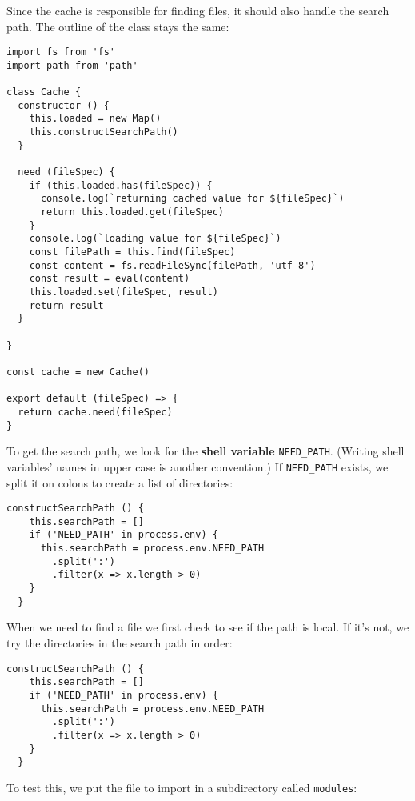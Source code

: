 \documentclass[krantzl]{krantz}
\newcommand{\glossref}[1]{\textbf{#1}}
\begin{document}
Since the cache is responsible for finding files,
it should also handle the search path.
The outline of the class stays the same:


\begin{lstlisting}[frame=tblr]
import fs from 'fs'
import path from 'path'

class Cache {
  constructor () {
    this.loaded = new Map()
    this.constructSearchPath()
  }

  need (fileSpec) {
    if (this.loaded.has(fileSpec)) {
      console.log(`returning cached value for ${fileSpec}`)
      return this.loaded.get(fileSpec)
    }
    console.log(`loading value for ${fileSpec}`)
    const filePath = this.find(fileSpec)
    const content = fs.readFileSync(filePath, 'utf-8')
    const result = eval(content)
    this.loaded.set(fileSpec, result)
    return result
  }

}

const cache = new Cache()

export default (fileSpec) => {
  return cache.need(fileSpec)
}
\end{lstlisting}



To get the search path,
we look for the \glossref{shell variable} \texttt{NEED\_PATH}.
(Writing shell variables’ names in upper case is another convention.)
If \texttt{NEED\_PATH} exists,
we split it on colons to create a list of directories:


\begin{lstlisting}[frame=tblr]
  constructSearchPath () {
    this.searchPath = []
    if ('NEED_PATH' in process.env) {
      this.searchPath = process.env.NEED_PATH
        .split(':')
        .filter(x => x.length > 0)
    }
  }
\end{lstlisting}



When we need to find a file we first check to see if the path is local.
If it’s not,
we try the directories in the search path in order:


\begin{lstlisting}[frame=tblr]
  constructSearchPath () {
    this.searchPath = []
    if ('NEED_PATH' in process.env) {
      this.searchPath = process.env.NEED_PATH
        .split(':')
        .filter(x => x.length > 0)
    }
  }
\end{lstlisting}



To test this,
we put the file to import in a subdirectory called \texttt{modules}:
\end{document}
